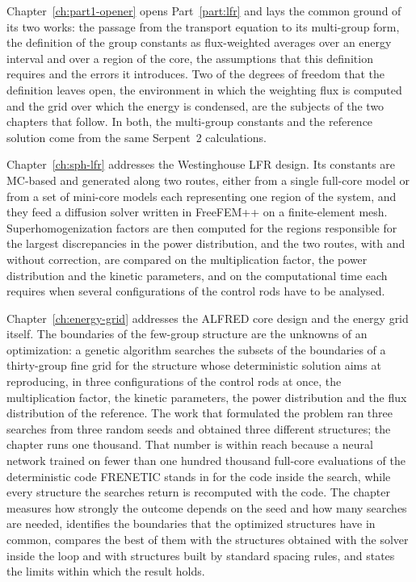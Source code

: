 Chapter~\ref{ch:part1-opener} opens Part~\ref{part:lfr} and lays the common
ground of its two works: the passage from the transport equation to its
multi-group form, the definition of the group constants as flux-weighted
averages over an energy interval and over a region of the core, the assumptions
that this definition requires and the errors it introduces. Two of the degrees
of freedom that the definition leaves open, the environment in which the
weighting flux is computed and the grid over which the energy is condensed, are
the subjects of the two chapters that follow. In both, the multi-group
constants and the reference solution come from the same Serpent~2 calculations.

Chapter~\ref{ch:sph-lfr} addresses the Westinghouse LFR design. Its constants
are MC-based and generated along two routes, either from a single full-core
model or from a set of mini-core models each representing one region of the
system, and they feed a
diffusion solver written in FreeFEM++ on a finite-element mesh.
Superhomogenization factors are then computed for the regions responsible for
the largest discrepancies in the power distribution, and the two routes, with
and without correction, are compared on the multiplication factor, the power
distribution and the kinetic parameters, and on the computational time each
requires when several configurations of the control rods have to be analysed.

Chapter~\ref{ch:energy-grid} addresses the ALFRED core design and the energy grid
itself. The boundaries of the few-group structure are the unknowns of an
optimization: a genetic algorithm searches the subsets of the boundaries of a
thirty-group fine grid for the structure whose deterministic solution aims at
reproducing, in three configurations of the control rods at once, the
multiplication factor, the kinetic parameters, the power distribution and the
flux distribution of the reference. The work that
formulated the problem ran three searches from three random seeds and
obtained three different structures; the chapter runs one thousand. That
number is within reach because a neural network trained on fewer than one
hundred thousand full-core evaluations of the deterministic code FRENETIC
stands in for the code inside the search, while every structure the searches
return is recomputed with the code. The chapter measures how strongly the
outcome depends on the seed and how many searches are needed, identifies the
boundaries that the optimized structures have in common, compares the best of
them with the structures obtained with the solver inside the loop and with
structures built by standard spacing rules, and states the limits within which
the result holds.

